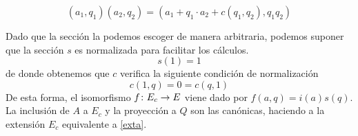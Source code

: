 \begin{equation}\label{extop}
(a_1,q_1)(a_2,q_2) = (a_1 + q_1\cdot a_2 + c(q_1,q_2),q_1q_2)
\end{equation}

Dado que la sección la podemos escoger de manera arbitraria, podemos suponer que la sección $s$ es normalizada para facilitar los cálculos.
\begin{equation}
	s(1) = 1
\end{equation}
de donde obtenemos que $c$ verifica la siguiente condición de normalización
\begin{equation}\label{cocnorm}
	c(1,q) = 0 = c(q,1)
\end{equation}
De esta forma, el isomorfismo $f\colon E_c\to E$ viene dado por $f(a,q) = i(a)s(q)$. La inclusión de $A$ a $E_c$ y la proyección a $Q$ son las canónicas, haciendo a la extensión $E_c$ equivalente a \eqref{exta}.



